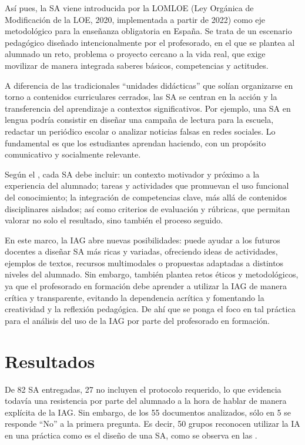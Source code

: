 \documentclass[spanish]{textolivre}
\begin{document}
Así pues, la SA viene introducida por la LOMLOE (Ley Orgánica de Modificación de la LOE, 2020, implementada a partir de 2022) como eje metodológico para la enseñanza obligatoria en España. Se trata de un escenario pedagógico diseñado intencionalmente por el profesorado, en el que se plantea al alumnado un reto, problema o proyecto cercano a la vida real, que exige movilizar de manera integrada saberes básicos, competencias y actitudes.

A diferencia de las tradicionales “unidades didácticas” que solían organizarse en torno a contenidos curriculares cerrados, las SA se centran en la acción y la transferencia del aprendizaje a contextos significativos. Por ejemplo, una SA en lengua podría consistir en diseñar una campaña de lectura para la escuela, redactar un periódico escolar o analizar noticias falsas en redes sociales. Lo fundamental es que los estudiantes aprendan haciendo, con un propósito comunicativo y socialmente relevante.

Según el \textcite{LOMLOE2022}, cada SA debe incluir: un contexto motivador y próximo a la experiencia del alumnado; tareas y actividades que promuevan el uso funcional del conocimiento; la integración de competencias clave, más allá de contenidos disciplinares aislados; así como criterios de evaluación y rúbricas, que permitan valorar no solo el resultado, sino también el proceso seguido.

En este marco, la IAG abre nuevas posibilidades: puede ayudar a los futuros docentes a diseñar SA más ricas y variadas, ofreciendo ideas de actividades, ejemplos de textos, recursos multimodales o propuestas adaptadas a distintos niveles del alumnado. Sin embargo, también plantea retos éticos y metodológicos, ya que el profesorado en formación debe aprender a utilizar la IAG de manera crítica y transparente, evitando la dependencia acrítica y fomentando la creatividad y la reflexión pedagógica. De ahí que se ponga el foco en tal práctica para el análisis del uso de la IAG por parte del profesorado en formación.

\section{Resultados}\label{sec-organizacao}
De 82 SA entregadas, 27 no incluyen el protocolo requerido, lo que evidencia todavía una resistencia por parte del alumnado a la hora de hablar de manera explícita de la IAG. Sin embargo, de los 55 documentos analizados, sólo en 5 se responde “No” a la primera pregunta. Es decir, 50 grupos reconocen utilizar la IA en una práctica como es el diseño de una SA, como se observa en las .
\end{document}

